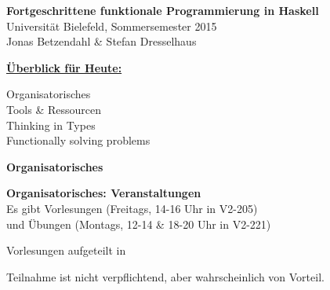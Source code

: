 \documentclass[unknownkeysallowed]{beamer}
\begin{document}
  

  \begin{frame}
  \begin{center}
    \Huge\textbf{Fortgeschrittene funktionale Programmierung in Haskell}\\ \bigskip
    \LARGE Universität Bielefeld, Sommersemester 2015\\ \bigskip
    \large Jonas Betzendahl \& Stefan Dresselhaus
    \end{center}
  \end{frame}

  
\begin{frame}
\begin{center}
	\Large\textbf{\underline{Überblick für Heute:}}\\ \bigskip\bigskip\normalsize
	
	Organisatorisches\\\bigskip
	Tools \& Ressourcen\\\bigskip
	Thinking in Types\\\bigskip
	Functionally solving problems\\\bigskip
    \end{center}
\end{frame}

  
  \begin{frame}

    \begin{center}
    \Large\textbf{Organisatorisches}
    \end{center}
  \end{frame}

  
  \begin{frame}
    \begin{center}
    \Large\textbf{Organisatorisches: Veranstaltungen}\\ \bigskip \normalsize
    Es gibt Vorlesungen (Freitags, 14-16 Uhr in V2-205)\\
    und Übungen (Montags, 12-14 \& 18-20 Uhr in V2-221)\bigskip

	Vorlesungen aufgeteilt in \bigskip
	
	Teilnahme ist nicht verpflichtend, aber wahrscheinlich von Vorteil.  
    \end{center}
  \end{frame}
  
\end{document}
